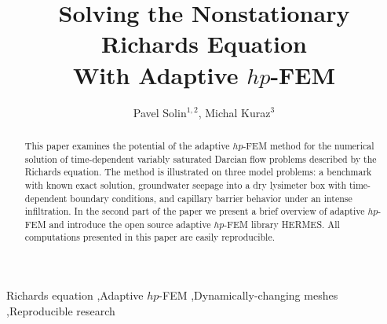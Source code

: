 \documentclass[final,3p,times,twocolumn]{elsarticle}
\begin{document}
\begin{frontmatter}



\title{Solving the Nonstationary Richards Equation\\
       With Adaptive $hp$-FEM}


\author{Pavel Solin$^{1,2}$, Michal Kuraz$^3$}

\address{${}^1$Department of Mathematics and Statistics, University of Nevada, Reno, USA}
\address{${}^2$Institute of Themomechanics, Prague, Czech Republic}
\address{${}^3$Department of Water Resources and Environmental Modeling, Czech University of Life Sciences, Prague, Czech Republic}

\begin{abstract}
This paper examines the potential of the adaptive $hp$-FEM method for the 
numerical solution of time-dependent variably saturated 
Darcian flow problems described by the Richards equation. The method is 
illustrated on three model problems: a benchmark with known exact solution, 
groundwater seepage into a dry lysimeter box with time-dependent boundary 
conditions, and capillary barrier behavior under an intense infiltration. 
In the second part of the paper we present a brief overview of adaptive 
$hp$-FEM and introduce the open source adaptive $hp$-FEM library HERMES.
All computations presented in this paper are easily reproducible.
\end{abstract}

\begin{keyword}
Richards equation \sep Adaptive $hp$-FEM \sep Dynamically-changing meshes \sep Reproducible research


\end{keyword}

\end{frontmatter}
\end{document}
